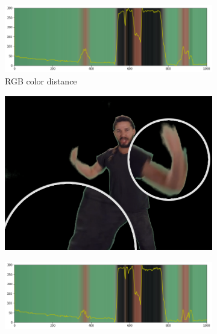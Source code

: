 \begin{figure}[htbp]
	\caption{Comparison between different color distance methods}
	\label{fig:chroma:image_comparison}
	\begin{subfigure}[t]{.65\textwidth}
		\centering
		\includegraphics[width=\textwidth]{gfx/distances/color-rgb.png}
		\caption{RGB color distance} 
	\end{subfigure}
	\begin{subfigure}[t]{.3\textwidth}
		\centering
		\includegraphics[width=\textwidth]{gfx/distances/zoom-rgb.png}
	\end{subfigure}
	\begin{subfigure}[t]{.65\textwidth}
		\centering
		\includegraphics[width=\textwidth]{gfx/distances/color-ycgco.png}

\end{subfigure}
\end{figure}

